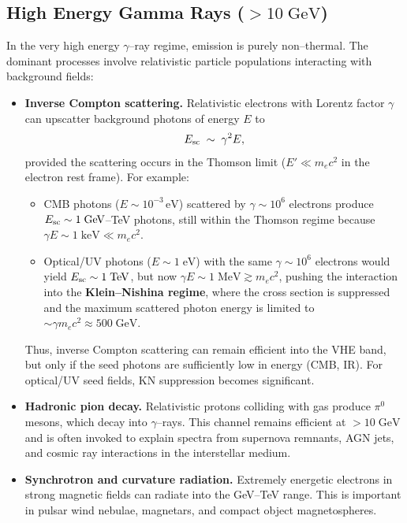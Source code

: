 \subsection{High Energy Gamma Rays ($>10\;\mathrm{GeV}$)}

In the very high energy $\gamma$--ray regime, emission is purely
non--thermal. The dominant processes involve relativistic particle
populations interacting with background fields:

\begin{itemize}
    \item \textbf{Inverse Compton scattering.}  
    Relativistic electrons with Lorentz factor $\gamma$ can upscatter
    background photons of energy $E$ to
    \[
        E_{\rm sc} \;\sim\; \gamma^2 E,
    \]
    provided the scattering occurs in the Thomson limit
    ($E' \ll m_e c^2$ in the electron rest frame).
    For example:
    \begin{itemize}
        \item CMB photons ($E \sim 10^{-3}\,\mathrm{eV}$) scattered by
              $\gamma \sim 10^6$ electrons produce
              $E_{\rm sc} \sim 1\;\mathrm{GeV}$--TeV photons, still
              within the Thomson regime because
              $\gamma E \sim 1\;\mathrm{keV} \ll m_e c^2$.
        \item Optical/UV photons ($E \sim 1\;\mathrm{eV}$) with the same
              $\gamma \sim 10^6$ electrons would yield
              $E_{\rm sc} \sim 1\;\mathrm{TeV}$, but now
              $\gamma E \sim 1\;\mathrm{MeV} \gtrsim m_e c^2$,
              pushing the interaction into the
              \textbf{Klein--Nishina regime}, where the cross section is
              suppressed and the maximum scattered photon energy is
              limited to $\sim \gamma m_e c^2 \approx 500\;\mathrm{GeV}$.
    \end{itemize}
    Thus, inverse Compton scattering can remain efficient into the VHE
    band, but only if the seed photons are sufficiently low in energy
    (CMB, IR). For optical/UV seed fields, KN suppression becomes
    significant.

    \item \textbf{Hadronic pion decay.}  
    Relativistic protons colliding with gas produce $\pi^0$ mesons,
    which decay into $\gamma$--rays. This channel remains efficient at
    $>10\;\mathrm{GeV}$ and is often invoked to explain spectra from
    supernova remnants, AGN jets, and cosmic ray interactions in the
    interstellar medium.

    \item \textbf{Synchrotron and curvature radiation.}  
    Extremely energetic electrons in strong magnetic fields can radiate
    into the GeV--TeV range. This is important in pulsar wind nebulae,
    magnetars, and compact object magnetospheres.
\end{itemize}

